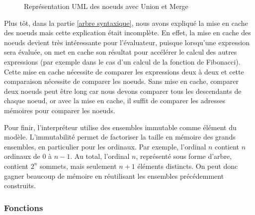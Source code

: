 \documentclass[a4paper, 11pt]{article}
\begin{document}
\begin{figure}[H]
{
    }

    \caption{Représentation UML des noeuds avec Union et Merge}
    \label{fig:uml nodes complete}
\end{figure}


Plus tôt, dans la partie \ref{arbre syntaxique}, nous avons
expliqué la mise en cache des noeuds mais cette explication était incomplète.
En effet, la mise en cache des noeuds devient très intéressante pour l'évaluateur,
puisque lorsqu'une expression sera évaluée, on met en cache son résultat pour accélérer
le calcul des autres expressions (par exemple dans le cas d'un calcul de la fonction
de Fibonacci). Cette mise en cache nécessite de comparer les expressions deux à deux
et cette comparaison nécessite de comparer les noeuds. Sans mise en cache, comparer deux
noeuds peut être long car nous devons comparer tous les descendants de chaque noeud, or
avec la mise en cache, il suffit de comparer les adresses mémoires pour comparer les noeuds.

Pour finir, l'interpréteur utilise des ensembles immutable
comme élément du modèle. L'immutabilité permet de
factoriser la taille en mémoire des grands ensembles, en particulier pour les ordinaux.
Par exemple, l'ordinal $n$ contient $n$ ordinaux de $0$ à $n-1$. Au total, l'ordinal
$n$, représenté sous forme d'arbre, contient $2^n$ sommets, mais seulement $n+1$ éléments
distincts. On peut donc gagner beaucoup de mémoire en réutilisant les ensembles
précédemment construits.

\subsubsection{Fonctions}
\end{document}
